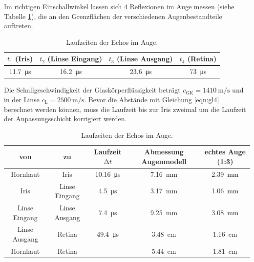 Im richtigen Einschallwinkel lassen sich 4 Reflexionen im Auge messen (siehe Tabelle \ref{tab:Auge1}), die an den Grenzflächen der verschiedenen Augenbestandteile auftreten.
\begin{table}
  \centering
  \caption{Laufzeiten der Echos im Auge.}
  \label{tab:Auge1}
  \begin{tabular}{c c c c}
    \toprule
    $t_1$ (Iris) & $t_2$ (Linse Eingang) & $t_3$ (Linse Ausgang) & $t_4$ (Retina) \\
    \midrule
    \SI{11.7}{\micro\second} & \SI{16.2}{\micro\second} & \SI{23.6}{\micro\second} & \SI{73}{\micro\second} \\
    \bottomrule
  \end{tabular}
\end{table}
Die Schallgeschwindigkeit der Glaskörperflüssigkeit beträgt $c_\text{GK} = \SI{1410}{\meter\per\second}$ und in der Linse $c_\text{L} = \SI{2500}{\meter\per\second}$.
Bevor die Abstände mit Gleichung \eqref{eqn:gl4} berechnet werden können, muss die Laufzeit bis zur Iris zweimal um die Laufzeit der Anpassungsschicht korrigiert werden.
\begin{table}
  \centering
  \caption{Laufzeiten der Echos im Auge.}
  \label{tab:Auge2}
  \begin{tabular}{c c c c c}
    \toprule
    von & zu & Laufzeit $\increment t$ & Abmessung Augenmodell & echtes Auge (1:3) \\
    \midrule
    Hornhaut & Iris & \SI{10.16}{\micro\second} & \SI{7.16}{\milli\meter} & \SI{2.39}{\milli\meter}  \\
    Iris & Linse Eingang & \SI{4.5}{\micro\second} & \SI{3.17}{\milli\meter} & \SI{1.06}{\milli\meter} \\
    Linse Eingang & Linse Ausgang & \SI{7.4}{\micro\second} & \SI{9.25}{\milli\meter} & \SI{3.08}{\milli\meter} \\
    Linse Ausgang & Retina & \SI{49.4}{\micro\second} & \SI{3.48}{\centi\meter} & \SI{1.16}{\centi\meter} \\
    Hornhaut & Retina & & \SI{5.44}{\centi\meter} & \SI{1.81}{\centi\meter} \\
    \bottomrule
  \end{tabular}
\end{table}
